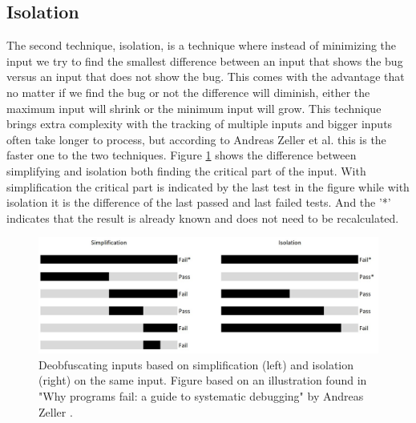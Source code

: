 \subsection{Isolation}
\label{inputReduction:Isolation}
The second technique, isolation, is a technique where instead of minimizing the input we try to find the smallest difference between an input that shows the bug versus an input that does not show the bug. This comes with the advantage that no matter if we find the bug or not the difference will diminish, either the maximum input will shrink or the minimum input will grow. 
This technique brings extra complexity with the tracking of multiple inputs and bigger inputs often take longer to process, but according to Andreas Zeller et al. \cite{5zeller2002simplifyingIsolatingFailure-inducing} this is the faster one to the two techniques. 
Figure \ref{fig:simplificationIsolation} shows the difference between simplifying and isolation both finding the critical part of the input. With simplification the critical part is indicated by the last test in the figure while with isolation it is the difference of the last passed and last failed tests. And the '*' indicates that the result is already known and does not need to be recalculated.
\begin{figure}
	\centering
	\includegraphics[width=1.0\textwidth]{images/simplificationIsolation}
	\caption{Deobfuscating inputs based on simplification (left) and isolation (right) on the same input. Figure based on an illustration found in "Why programs fail: a guide to systematic debugging" by Andreas Zeller \cite{bookZellerwhyProgramsFail}.}
	\label{fig:simplificationIsolation}
\end{figure}

